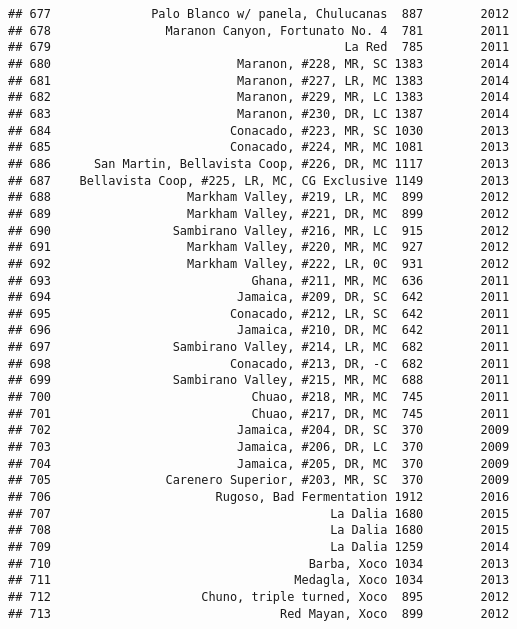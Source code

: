 \documentclass[
]{article}
\begin{document}
\begin{verbatim}
## 677              Palo Blanco w/ panela, Chulucanas  887        2012
## 678                Maranon Canyon, Fortunato No. 4  781        2011
## 679                                         La Red  785        2011
## 680                          Maranon, #228, MR, SC 1383        2014
## 681                          Maranon, #227, LR, MC 1383        2014
## 682                          Maranon, #229, MR, LC 1383        2014
## 683                          Maranon, #230, DR, LC 1387        2014
## 684                         Conacado, #223, MR, SC 1030        2013
## 685                         Conacado, #224, MR, MC 1081        2013
## 686      San Martin, Bellavista Coop, #226, DR, MC 1117        2013
## 687    Bellavista Coop, #225, LR, MC, CG Exclusive 1149        2013
## 688                   Markham Valley, #219, LR, MC  899        2012
## 689                   Markham Valley, #221, DR, MC  899        2012
## 690                 Sambirano Valley, #216, MR, LC  915        2012
## 691                   Markham Valley, #220, MR, MC  927        2012
## 692                   Markham Valley, #222, LR, 0C  931        2012
## 693                            Ghana, #211, MR, MC  636        2011
## 694                          Jamaica, #209, DR, SC  642        2011
## 695                         Conacado, #212, LR, SC  642        2011
## 696                          Jamaica, #210, DR, MC  642        2011
## 697                 Sambirano Valley, #214, LR, MC  682        2011
## 698                         Conacado, #213, DR, -C  682        2011
## 699                 Sambirano Valley, #215, MR, MC  688        2011
## 700                            Chuao, #218, MR, MC  745        2011
## 701                            Chuao, #217, DR, MC  745        2011
## 702                          Jamaica, #204, DR, SC  370        2009
## 703                          Jamaica, #206, DR, LC  370        2009
## 704                          Jamaica, #205, DR, MC  370        2009
## 705                Carenero Superior, #203, MR, SC  370        2009
## 706                       Rugoso, Bad Fermentation 1912        2016
## 707                                       La Dalia 1680        2015
## 708                                       La Dalia 1680        2015
## 709                                       La Dalia 1259        2014
## 710                                    Barba, Xoco 1034        2013
## 711                                  Medagla, Xoco 1034        2013
## 712                     Chuno, triple turned, Xoco  895        2012
## 713                                Red Mayan, Xoco  899        2012

\end{verbatim}
\end{document}
